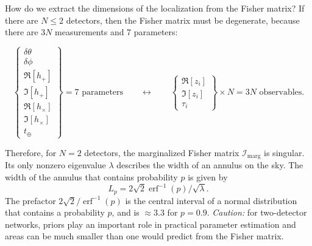 \documentclass[amsmath,amssymb,aps,prx,reprint,nopreprintnumbers,nofootinbib,showpacs]{revtex4-1}
\DeclareMathOperator{\erf}{erf}
\begin{document}
How do we extract the dimensions of the localization from the Fisher matrix? If there are $N \leq 2$ detectors, then the Fisher matrix must be degenerate, because there are $3N$ measurements and 7 parameters:
%
\begin{widetext}
\begin{equation*}
    \left\{
    \begin{array}{c}
        \delta\theta \\
        \delta\phi \\
        \Re[h_+] \\
        \Im[h_+] \\
        \Re[h_\times] \\
        \Im[h_\times] \\
        t_\oplus
    \end{array}
    \right\}
    = 7 \text{ parameters}
    \qquad
    \longleftrightarrow
    \qquad
    \left\{
    \begin{array}{c}
        \Re[z_i] \\
        \Im[z_i] \\
        \tau_i
    \end{array}
    \right\}
    \times N = 3N \text{ observables.}
\end{equation*}
\end{widetext}
%
Therefore, for $N=2$ detectors, the marginalized Fisher matrix $\mathcal{I}_\mathrm{marg}$ is singular. Its only nonzero eigenvalue $\lambda$ describes the width of an annulus on the sky. The width of the annulus that contains probability $p$ is given by
%
\begin{equation}\label{eq:l-pth-quantile}
    L_p = 2 \sqrt{2} \erf^{-1}(p) / \sqrt{\lambda}.
\end{equation}
%
The prefactor $2 \sqrt{2} / \erf^{-1}(p)$ is the central interval of a normal distribution that contains a probability $p$, and is $\approx 3.3$ for $p = 0.9$. \emph{Caution:} for two\nobreakdashes-detector networks, priors play an important role in practical parameter estimation and areas can be much smaller than one would predict from the Fisher matrix.
\end{document}
